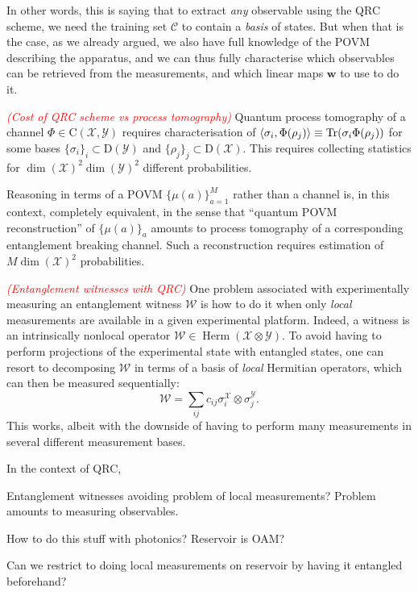 \documentclass[12pt]{report}
\newcommand{\bs}[1]{\boldsymbol{#1}}
\newcommand{\calC}{{\mathcal{C}}}
\newcommand{\calY}{{\mathcal{Y}}}
\newcommand{\calW}{{\mathcal{W}}}
\newcommand{\calX}{{\mathcal{X}}}
\newcommand{\rmC}{{\mathrm{C}}}
\newcommand{\rmD}{{\mathrm{D}}}
\DeclareMathOperator{\Herm}{Herm}
\begin{document}
In other words, this is saying that to extract \emph{any} observable using the QRC scheme, we need the training set $\calC$ to contain a \emph{basis} of states. But when that is the case, as we already argued, we also have full knowledge of the POVM describing the apparatus, and we can thus fully characterise which observables can be retrieved from the measurements, and which linear maps $\bs w$ to use to do it.

\textcolor{red}{\emph{(Cost of QRC scheme vs process tomography)}}
Quantum process tomography of a channel $\Phi\in\rmC(\calX,\calY)$ requires characterisation of $\langle\sigma_i,\Phi(\rho_j)\rangle\equiv\Tr(\sigma_i\Phi(\rho_j))$ for some bases $\{\sigma_i\}_i\subset\rmD(\calY)$ and $\{\rho_j\}_j\subset\rmD(\calX)$.
This requires collecting statistics for $\dim(\calX)^2\dim(\calY)^2$ different probabilities.

Reasoning in terms of a POVM $\{\mu(a)\}_{a=1}^M$ rather than a channel is, in this context, completely equivalent, in the sense that ``quantum POVM reconstruction'' of $\{\mu(a)\}_a$ amounts to process tomography of a corresponding entanglement breaking channel.
Such a reconstruction requires estimation of $M\dim(\calX)^2$ probabilities.

\textcolor{red}{\emph{(Entanglement witnesses with QRC)}}
One problem associated with experimentally measuring an entanglement witness $\calW$ is how to do it when only \emph{local} measurements are available in a given experimental platform.
Indeed, a witness is an intrinsically nonlocal operator $\calW\in\Herm(\calX\otimes\calY)$.
To avoid having to perform projections of the experimental state with entangled states, one can resort to decomposing $\calW$ in terms of a basis of \emph{local} Hermitian operators, which can then be measured sequentially:
\begin{equation}
	\calW = \sum_{ij} c_{ij} \sigma_i^\calX\otimes\sigma_j^\calY.
\end{equation}
This works, albeit with the downside of having to perform many measurements in several different measurement bases.

In the context of QRC, 

Entanglement witnesses avoiding problem of local measurements?
Problem amounts to measuring observables.

How to do this stuff with photonics? Reservoir is OAM?

Can we restrict to doing local measurements on reservoir by having it entangled beforehand?
\end{document}
